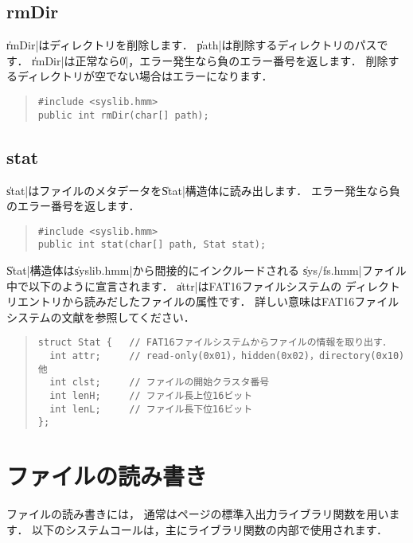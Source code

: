 \subsection{rmDir}

\|rmDir|はディレクトリを削除します．
\|path|は削除するディレクトリのパスです．
\|rmDir|は正常なら\|0|，エラー発生なら負のエラー番号を返します．
削除するディレクトリが空でない場合はエラーになります．

\begin{quote}
\begin{verbatim}
#include <syslib.hmm>
public int rmDir(char[] path);
\end{verbatim}
\end{quote}

\subsection{stat}

\|stat|はファイルのメタデータを\|Stat|構造体に読み出します．
エラー発生なら負のエラー番号を返します．

\begin{quote}
\begin{verbatim}
#include <syslib.hmm>
public int stat(char[] path, Stat stat);
\end{verbatim}
\end{quote}

\|Stat|構造体は\|syslib.hmm|から間接的にインクルードされる
\|sys/fs.hmm|ファイル中で以下のように宣言されます．
\|attr|はFAT16ファイルシステムの
ディレクトリエントリから読みだしたファイルの属性です．
詳しい意味はFAT16ファイルシステムの文献を参照してください．

\begin{quote}
\begin{verbatim}
struct Stat {   // FAT16ファイルシステムからファイルの情報を取り出す．
  int attr;     // read-only(0x01)，hidden(0x02)，directory(0x10) 他
  int clst;     // ファイルの開始クラスタ番号
  int lenH;     // ファイル長上位16ビット
  int lenL;     // ファイル長下位16ビット
};
\end{verbatim}
\end{quote}

\section{ファイルの読み書き}

ファイルの読み書きには，
通常は\pageref{chap4:stdio}ページの標準入出力ライブラリ関数を用います．
以下のシステムコールは，主にライブラリ関数の内部で使用されます．

